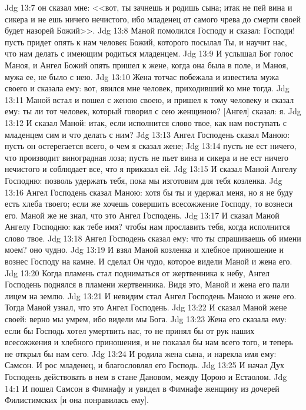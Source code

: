 \vs Jdg 13:7 он сказал мне: <<вот, ты зачнешь и родишь сына; итак не пей вина и сикера и не ешь ничего нечистого, ибо младенец от самого чрева до смерти своей будет назорей Божий>>.
\vs Jdg 13:8 Маной помолился Господу и сказал: Господи! пусть придет опять к нам человек Божий, которого посылал Ты, и научит нас, что нам делать с имеющим родиться младенцем.
\vs Jdg 13:9 И услышал Бог голос Маноя, и Ангел Божий опять пришел к жене, когда она была в поле, и Маноя, мужа ее, не было с нею.
\vs Jdg 13:10 Жена тотчас побежала и известила мужа своего и сказала ему: вот, явился мне человек, приходивший ко мне тогда.
\vs Jdg 13:11 Маной встал и пошел с женою своею, и пришел к тому человеку и сказал ему: ты ли тот человек, который говорил с сею женщиною? [Ангел] сказал: я.
\vs Jdg 13:12 И сказал Маной: итак, если исполнится слово твое, как нам поступать с младенцем сим и что делать с ним?
\vs Jdg 13:13 Ангел Господень сказал Маною: пусть он остерегается всего, о чем я сказал жене;
\vs Jdg 13:14 пусть не ест ничего, что производит виноградная лоза; пусть не пьет вина и сикера и не ест ничего нечистого и соблюдает все, что я приказал ей.
\vs Jdg 13:15 И сказал Маной Ангелу Господню: позволь удержать тебя, пока мы изготовим для тебя козленка.
\vs Jdg 13:16 Ангел Господень сказал Маною: хотя бы ты и удержал меня, но я не буду есть хлеба твоего; если же хочешь совершить всесожжение Господу, то вознеси его. Маной же не знал, что это Ангел Господень.
\vs Jdg 13:17 И сказал Маной Ангелу Господню: как тебе имя? чтобы нам прославить тебя, когда исполнится слово твое.
\vs Jdg 13:18 Ангел Господень сказал ему: что ты спрашиваешь об имени моем? оно чудно.
\vs Jdg 13:19 И взял Маной козленка и хлебное приношение и вознес Господу на камне. И сделал Он чудо, которое видели Маной и жена его.
\vs Jdg 13:20 Когда пламень стал подниматься от жертвенника к небу, Ангел Господень поднялся в пламени жертвенника. Видя это, Маной и жена его пали лицем на землю.
\vs Jdg 13:21 И невидим стал Ангел Господень Маною и жене его. Тогда Маной узнал, что это Ангел Господень.
\vs Jdg 13:22 И сказал Маной жене своей: верно мы умрем, ибо видели мы Бога.
\vs Jdg 13:23 Жена его сказала ему: если бы Господь хотел умертвить нас, то не принял бы от рук наших всесожжения и хлебного приношения, и не показал бы нам всего того, и теперь не открыл бы нам сего.
\vs Jdg 13:24 И родила жена сына, и нарекла имя ему: Самсон. И рос младенец, и благословлял его Господь.
\vs Jdg 13:25 И начал Дух Господень действовать в нем в стане Дановом, между Цорою и Естаолом.
\vs Jdg 14:1 И пошел Самсон в Фимнафу и увидел в Фимнафе женщину из дочерей Филистимских [и она понравилась ему].
